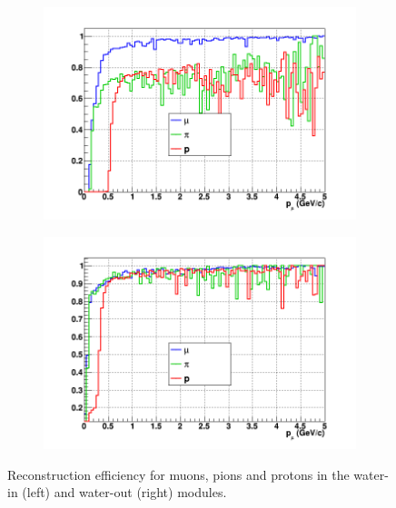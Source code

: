 \begin{figure}
  \centering
    \begin{subfigure}{.49\textwidth}
      \includegraphics[width=\linewidth]{fig/EfficiencyParticles_Momentum.png}
    \end{subfigure}
    \begin{subfigure}{.49\textwidth}
      \includegraphics[width=\linewidth]{fig/EfficiencyParticles_Momentum_Empty.png}
    \end{subfigure}
  \caption{\label{fig:reconstructionefficiencyparticle_mometum} Reconstruction efficiency for muons, pions and protons in the water-in (left) and water-out (right) modules.}
\end{figure}

